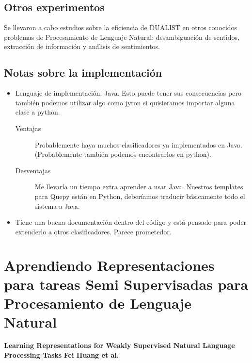 \documentclass[11pt,spanish]{article}
\begin{document}
\subsection{Otros experimentos}
Se llevaron a cabo estudios sobre la eficiencia de DUALIST en otros conocidos
problemas de Procesamiento de Lenguaje Natural: desambiguación de sentidos,
extracción de información y análisis de sentimientos.

\subsection{Notas sobre la implementación}
\begin{itemize}
    \item Lenguaje de implementación: Java. Esto puede tener sus consecuencias
    pero también podemos utilizar algo como jyton si quisieramos importar
    alguna clase a python.
    \begin{description}
        \item[Ventajas] Probablemente haya muchos clasificadores ya
        implementados en Java. (Probablemente también podemos encontrarlos
        en python).
        \item[Desventajas] Me llevaría un tiempo extra aprender a usar Java.
        Nuestros templates para Quepy están en Python, deberíamos traducir
        básicamente todo el sistema a Java.
    \end{description}
    \item Tiene una buena documentación dentro del código y está pensado para
    poder extenderlo a otros clasificadores. Parece prometedor.
\end{itemize}


\section{Aprendiendo Representaciones para tareas Semi Supervisadas para Procesamiento de Lenguaje Natural}
\textbf{Learning Representations for Weakly Supervised Natural Language Processing Tasks}
\textbf{Fei Huang et al.}\\\\
\end{document}
